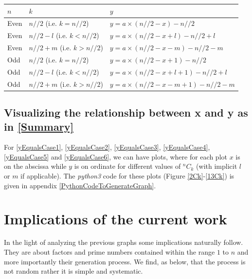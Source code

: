 \documentclass[12pt, twoside]{article}
\newcommand*{\Combination}[2]{{}^{#1}C_{#2}}%
\begin{document}
\begin{tabular}{|l ||l ||l|}
	\hline
	\textbf{$n$} & \textbf{$k$} & \textbf{$y$} \\
	\hline
	Even & $n//2$ \space(i.e. $k = n//2$) & $y = a \times (n//2-x) - n//2$ \\
	\hline
	Even & $n//2 - l$ \space(i.e. $k < n//2$) & $y = a \times (n//2-x+l ) - n//2 + l$ \\
	\hline
	Even & $n//2 + m $ (i.e. $k > n//2$) & $y = a \times (n//2-x-m ) - n//2 -m$ \\
	\hline
	Odd & $n//2 $ \space(i.e. $k = n//2$) & $y = a \times (n//2-x +1) - n//2$ \\
	\hline
	Odd & $n//2 - l $ \space(i.e. $k < n//2$) & $y = a \times (n//2-x+l +1) - n//2 + l$ \\
	\hline
	Odd & $n//2 + m $ (i.e. $k > n//2$)  & $y = a \times (n//2-x-m +1 ) - n//2 -m $ \\
	\hline
\end{tabular}
\subsection{Visualizing the relationship between x and y as in \ref{Summary}}
For \eqref{yEqualsCase1}, \eqref{yEqualsCase2}, \eqref{yEqualsCase3}, \eqref{yEqualsCase4}, \eqref{yEqualsCase5} and \eqref{yEqualsCase6}, we can have plots, where for each plot $x$ is on the abscissa while $y$ is on ordinate for different values of $\Combination{n}{k}$ (with implicit $l$ or $m$ if applicable).
The \textit{python3} code for these plots (Figure \ref{2Ck}-\ref{13Ck}) is given in appendix \ref{PythonCodeToGenerateGraph}.
\section{Implications of the current work}
In the light of analyzing the previous graphs some implications naturally follow. They are about factors and prime numbers contained within the range $1$ to $n$ and more importantly their generation process. We find, as below, that the process is not random rather it is simple and systematic.
\end{document}
